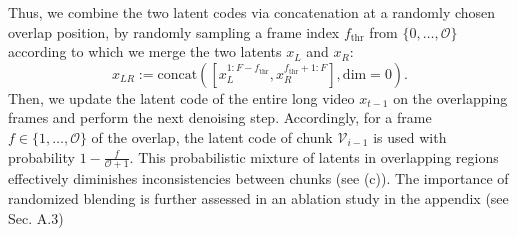 Thus, we combine the two latent codes via concatenation at a randomly chosen overlap position, by randomly sampling a frame index $f_{\text{thr}}$ from  $\{0,\ldots,\mathcal{O}\}$ according to which we merge the two latents $x_{L}$ and $x_{R}$:
\begin{equation}
x_{LR} := \mathrm{concat}([x_{L}^{1:F-f_{\text{thr}}},x_{R}^{f_{\text{thr}}+1:F}], \mathrm{dim} = 0).
\end{equation}
Then, we update the latent code of the entire long video $x_{t-1}$ on the overlapping frames and perform the next denoising step.  Accordingly, for a frame $f \in \{1,\ldots,\mathcal{O} \}$ of the overlap, the latent code of  chunk $\mathcal{V}_{i-1}$ is used with probability $1- \frac{f}{\mathcal{O}+1}$.
%
This probabilistic mixture of latents in overlapping regions effectively diminishes inconsistencies between chunks (see (c)).
%
The importance of randomized blending is further assessed in an ablation study in the appendix
(see Sec. \textcolor{linkblue}{A.3})



